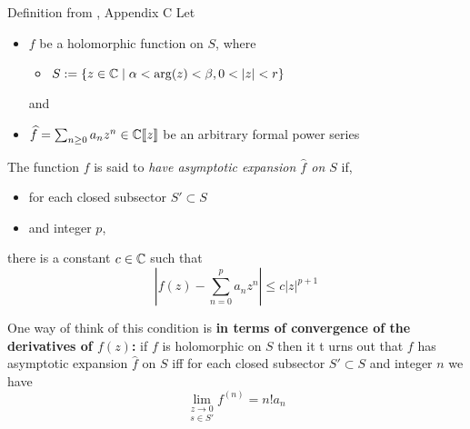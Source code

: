 {  \begin{frame}[t]{Definition from \cite{thboalch}, Appendix C}
    Let
    \begin{itemize}
      \item $f$ be a holomorphic function on $S$, where
        \begin{itemize}
          \item $S:=\{z\in\C\mid\alpha<\arg(z)<\beta, 0<|z|<r\}$
        \end{itemize}
        and
      \item $\widehat f=\sum_{n\geq0}a_nz^n\in \mathbb{C}\llbracket z\rrbracket$ be an
        arbitrary formal power series
    \end{itemize}
    \begin{defn}[C.1]
      The function $f$ is said to \emph{have asymptotic expansion $\hat f$ on
      $S$} if,
      \begin{itemize}
        \item for each closed subsector $S'\subset S$
        \item and integer $p$,
      \end{itemize}
      there is a constant $c\in\mathbb{C}$ such that
      \[
        \left|f(z)-\sum_{n=0}^pa_nz^n\right|\leq c|z|^{p+1}
      \]
    \end{defn}
    One way of think of this condition is \textbf{in terms of convergence of
    the derivatives of $f(z)$:}
    if $f$ is holomorphic on $S$ then it t urns out that $f$ has asymptotic
    expansion $\hat f$ on $S$ iff for each closed subsector $S'\subset S$ and
    integer $n$ we have
    \[
      \underset{s\in S'}{\lim_{z\to0}} f^{(n)}=n!a_n
    \]
  \end{frame}

}
